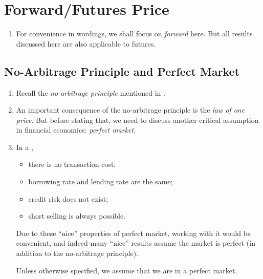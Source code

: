 \section{Forward/Futures Price}
\label{sect:fwd-futures-price}
\begin{enumerate}
\item For convenience in wordings, we shall focus on \emph{forward} here. But all
results discussed here are also applicable to futures.
\end{enumerate}
\subsection{No-Arbitrage Principle and Perfect Market}
\begin{enumerate}
\item Recall the \emph{no-arbitrage principle} mentioned in
.
\item An important consequence of the no-arbitrage principle is the \emph{law
of one price}. But before stating that, we need to discuss another critical
assumption in financial economics: \emph{perfect market}.
\item \label{it:perfect-mkt}
In a ,
\begin{itemize}
\item there is no transaction cost;
\item borrowing rate and lending rate are the same;
\item credit risk does not exist;
\item short selling is always possible.
\end{itemize}
Due to these ``nice'' properties of perfect market, working with it would be
convenient, and indeed many ``nice'' results assume the market is perfect (in
addition to the no-arbitrage principle).

Unless otherwise specified, we assume that we are in a perfect market.


\end{enumerate}
